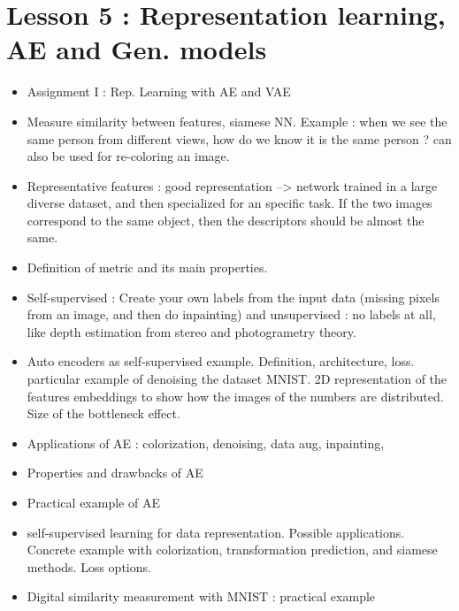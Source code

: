 \documentclass[12pt,a4paper]{article}
\begin{document}
\section*{Lesson 5 : Representation learning, AE and Gen. models}
\begin{itemize}
    \item Assignment I : Rep. Learning with AE and VAE
    
    \item Measure similarity between features, siamese NN.
    Example : when we see the same person from different
    views, how do we know it is the same person ?
    can also be used for re-coloring an image.
    
    \item Representative features : good representation --> network trained
    in a large diverse dataset, and then specialized for an specific task.
    If the two images correspond to the same object, then the descriptors should
    be almost the same.
    
    \item Definition of metric and its main properties.
    
    \item Self-supervised : Create your own labels from the input data
    (missing pixels from an image, and then do inpainting)
    and unsupervised : no labels at all, like depth estimation from
    stereo and photogrametry theory.
    
    \item Auto encoders as self-supervised example. Definition, architecture, loss. particular example
    of denoising the dataset MNIST. 2D representation of the features embeddings to show
    how the images of the numbers are distributed. Size of the bottleneck effect.
    
    \item Applications of AE : colorization, denoising, data aug, inpainting,
    
    \item Properties and drawbacks of AE
    
    \item Practical example of AE
    
    \item self-supervised learning  for data representation. Possible applications. Concrete example
    with colorization, transformation prediction, and siamese methods. Loss options.
    
    \item Digital similarity measurement with MNIST : practical example
    

\end{itemize}
\end{document}

